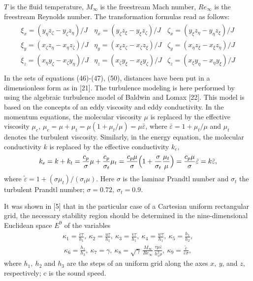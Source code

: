 $T$ is the fluid temperature, $M_{\infty}$ is the freestream Mach number,
$Re_{\infty}$ is the freestream Reynolds number.
The transformation formulas read as follows:
\begin{eqnarray}
\left. \begin{array}{ccc}
\xi_x=(y_{\eta}z_{\zeta} - y_{\zeta}z_{\eta})/J&
\eta_x=(y_{\zeta}z_{\xi} - y_{\xi}z_{\zeta})/J &
\zeta_x=(y_{\xi}z_{\eta}-y_{\eta}z_{\xi})/J\\
\xi_y=(x_{\zeta}z_{\eta} - x_{\eta}z_{\zeta})/J&
\eta_y=(x_{\xi}z_{\zeta}-x_{\zeta}z_{\xi})/J   &
\zeta_y=(x_{\eta}z_{\xi} - x_{\xi}z_{\eta})/J\\
\xi_z=(x_{\eta}y_{\zeta} - x_{\zeta}y_{\eta})/J&
\eta_z=(x_{\zeta}y_{\xi}-x_{\xi}y_{\zeta})/J   &
\zeta_z=(x_{\xi}y_{\eta} - x_{\eta}y_{\xi})/J\\
\end{array} \right.
\end{eqnarray}
   In the sets of equations (46)-(47), (50),
distances have been put in a dimensionless form as in [21]. The
turbulence modeling is here performed by using the algebraic
turbulence model of Baldwin and Lomax [22].  This model is based on
the concepts of an eddy viscosity and eddy conductivity. In the
momentum equations, the molecular viscosity $\mu$ is replaced by the
effective viscosity $\mu_e$, $\mu_e = \mu + \mu_t = \mu(1 +\mu_t/\mu)
= \mu \bar{\varepsilon}$, where $\bar{\varepsilon}= 1 + \mu_t/\mu$ and
$\mu_t$ denotes the turbulent viscosity. Similarly, in the energy
equation, the molecular conductivity $k$ is replaced by the effective
conductivity $k_e$,
\begin{eqnarray*}
k_e=k+k_t=\frac{c_p}{\sigma}\mu + \frac{c_p}{\sigma_t}\mu_t=
\frac{c_p \mu}{\sigma}\Bigl(1+\frac{\sigma}{\sigma_t}\frac{\mu_t}{\mu}\Bigr)=
\frac{c_p\mu}{\sigma}\tilde{\varepsilon} = k\tilde{\varepsilon},
\end{eqnarray*}
where $\tilde{\varepsilon}=1 + (\sigma\mu_t)/(\sigma_t\mu)$.
Here $\sigma$ is the laminar Prandtl number and $\sigma_t$ the turbulent
Prandtl number; $\sigma=0.72,~\sigma_t=0.9$.

    It was shown in [5] that in the particular case of a Cartesian uniform
rectangular grid, the necessary stability region should be determined in the
nine-dimensional Euclidean space $E^9$ of the variables
\begin{eqnarray}
\kappa_1 = \frac{c\tau}{h_1},~\kappa_2 = \frac{u\tau}{h_1},
~\kappa_3 = \frac{v\tau}{h_1},~\kappa_4 = \frac{w\tau}{h_1},
~\kappa_5 = \frac{h_1}{h_2},\nonumber\\
~\kappa_6 = \frac{h_1}{h_3},~\kappa_7 = \gamma,
~\kappa_8 = \sqrt{\gamma}\,\frac{M_{\infty}}{Re_{\infty}}\,\frac{\tau\mu
\bar{\varepsilon}}{h_1^2\rho},~\kappa_9 = \frac{\tilde{\varepsilon}}
{\bar{\varepsilon}\sigma},
\end{eqnarray}
where $h_1,~h_2$ and $h_3$ are the steps of an uniform grid along the
axes $x,~y$, and $z$, respectively; c is the sound speed.

